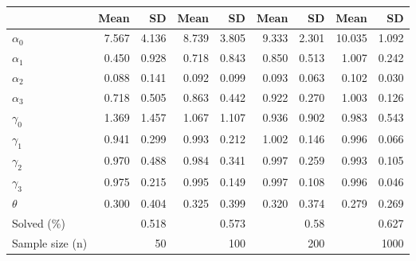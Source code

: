 
\begin{tabular}[t]{lrrrrrrrr}
\toprule
  & Mean & SD & Mean  & SD  & Mean   & SD   & Mean    & SD   \\
\midrule
$\alpha_{0}$ & 7.567 & 4.136 & 8.739 & 3.805 & 9.333 & 2.301 & 10.035 & 1.092\\
$\alpha_{1}$ & 0.450 & 0.928 & 0.718 & 0.843 & 0.850 & 0.513 & 1.007 & 0.242\\
$\alpha_{2}$ & 0.088 & 0.141 & 0.092 & 0.099 & 0.093 & 0.063 & 0.102 & 0.030\\
$\alpha_{3}$ & 0.718 & 0.505 & 0.863 & 0.442 & 0.922 & 0.270 & 1.003 & 0.126\\
$\gamma_{0}$ & 1.369 & 1.457 & 1.067 & 1.107 & 0.936 & 0.902 & 0.983 & 0.543\\
$\gamma_{1}$ & 0.941 & 0.299 & 0.993 & 0.212 & 1.002 & 0.146 & 0.996 & 0.066\\
$\gamma_{2}$ & 0.970 & 0.488 & 0.984 & 0.341 & 0.997 & 0.259 & 0.993 & 0.105\\
$\gamma_{3}$ & 0.975 & 0.215 & 0.995 & 0.149 & 0.997 & 0.108 & 0.996 & 0.046\\
$\theta$ & 0.300 & 0.404 & 0.325 & 0.399 & 0.320 & 0.374 & 0.279 & 0.269\\
Solved (\%) &  & 0.518 &  & 0.573 &  & 0.58 &  & 0.627\\
Sample size (n) &  & 50 &  & 100 &  & 200 &  & 1000\\
\bottomrule
\end{tabular}
